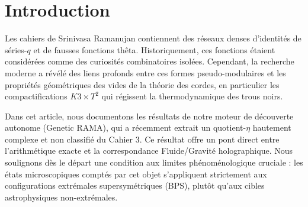 \section{Introduction}
Les cahiers de Srinivasa Ramanujan contiennent des réseaux denses d'identités de séries-$q$ et de fausses fonctions thêta. Historiquement, ces fonctions étaient considérées comme des curiosités combinatoires isolées. Cependant, la recherche moderne a révélé des liens profonds entre ces formes pseudo-modulaires et les propriétés géométriques des vides de la théorie des cordes, en particulier les compactifications $K3 \times T^2$ qui régissent la thermodynamique des trous noirs.

Dans cet article, nous documentons les résultats de notre moteur de découverte autonome (Genetic RAMA), qui a récemment extrait un quotient-$\eta$ hautement complexe et non classifié du Cahier 3. Ce résultat offre un pont direct entre l'arithmétique exacte et la correspondance Fluide/Gravité holographique. Nous soulignons dès le départ une condition aux limites phénoménologique cruciale : les états microscopiques comptés par cet objet s'appliquent strictement aux configurations extrémales supersymétriques (BPS), plutôt qu'aux cibles astrophysiques non-extrémales.
